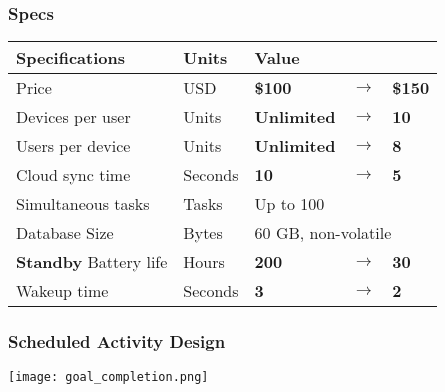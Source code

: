 \documentclass{beamer}
\begin{document}
\begin{frame}
  \frametitle{Specs}
  \centering
    \begin{tabular}{lllll}
    \hline
    Specifications                & Units   & \multicolumn{3}{l}{Value}                        \\
    \hline
    Price                         & USD     & \textbf{\$100}     & \textbf{$\rightarrow$} & \textbf{\$150} \\
    Devices per user              & Units   & \textbf{Unlimited} & \textbf{$\rightarrow$} & \textbf{10}    \\
    Users per device              & Units   & \textbf{Unlimited} & \textbf{$\rightarrow$} & \textbf{8}     \\
    Cloud sync time               & Seconds & \textbf{10}        & \textbf{$\rightarrow$} & \textbf{5}     \\
    Simultaneous tasks             & Tasks   & \multicolumn{3}{l}{Up to 100}                    \\
    Database Size                 & Bytes   & \multicolumn{3}{l}{60 GB, non-volatile}          \\
    \textbf{Standby} Battery life & Hours   & \textbf{200}       & \textbf{$\rightarrow$} & \textbf{30}    \\
    Wakeup time                   & Seconds & \textbf{3}         & \textbf{$\rightarrow$} & \textbf{2}    \\
    \hline
    \end{tabular}
\end{frame}

\begin{frame}
  \frametitle{Scheduled Activity Design}

  \texttt{[image: goal\_completion.png]}

  

\end{frame}
\end{document}
